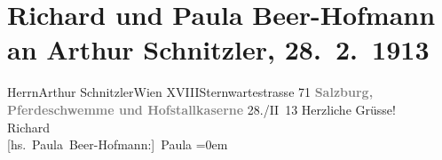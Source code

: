 

         \renewcommand{\erwaehnteOrte}{Orte: Hofmarstallschwemme, Hofstallkaserne, Salzburg, Sternwartestraße, Wien, XVIII., Währing}
         \renewcommand{\erwaehnteWerke}{}
               \section[Richard und Paula Beer-Hofmann an Arthur Schnitzler, 28. 2. 1913]{ Richard und Paula Beer-Hofmann an Arthur Schnitzler,
               28. 2. 1913}\nopagebreak{}\rehead{ }\begin{ledgroupsized}[t]{13cm}\normalsize\beginnumbering \toendnotes[C]{\smallbreak\pagebreak[2]} 
\pstart{}{\pb}Herrn\pend{}\pstart{}Arthur Schnitzler\pend{}\pstart{}Wien XVIII\pend{}\pstart{}Sternwartestrasse 71\pend{}{\bigskip}\pstart
           \noindent{}\centering{}{\pb}\textcolor{gray}{\textbf{Salzburg, Pferdeschwemme und
                     Hofstallkaserne}}\pend
           \pstart
           {\pb}28./II 13\pend
           \pstart
           Herzliche Grüsse!{\\[\baselineskip]}\spacefill\mbox{Richard}{\\[\baselineskip]}\spacefill\mbox{{[}hs. Paula Beer-Hofmann:{]} Paula}\pend
           \leftskip=0em{}
         
         \endnumbering{}\end{ledgroupsized}  \newcommand{\dateiname}{L02115}\newcommand{\titel}{Richard und Paula Beer-Hofmann an Arthur Schnitzler, 28. 2. 1913}\newcommand{\editorInnen}{Martin Anton Müller und Gerd-Hermann Susen}
      